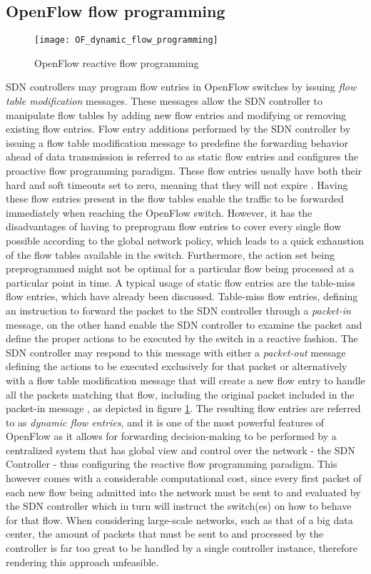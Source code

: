 \subsection{OpenFlow flow programming}
\label{subsection:openflow-flow-programming}
%
\begin{figure}
	\centering
	\texttt{[image: OF\_dynamic\_flow\_programming]}
	\caption{OpenFlow reactive flow programming}
	\label{fig:OF_dynamic_flow_programming}
\end{figure}
%
\gls{SDN} controllers may program flow entries in OpenFlow switches by issuing \emph{flow table modification} messages.
These messages allow the \gls{SDN} controller to manipulate flow tables by adding new flow entries and modifying or removing existing flow entries.
Flow entry additions performed by the \gls{SDN} controller by issuing a flow table modification message to predefine the forwarding behavior ahead of data transmission is referred to as static flow entries and configures the proactive flow programming paradigm.
These flow entries usually have both their hard and soft timeouts set to zero, meaning that they will not expire \cite{OF13}.
Having these flow entries present in the flow tables enable the traffic to be forwarded immediately when reaching the OpenFlow switch.
However, it has the disadvantages of having to preprogram flow entries to cover every single flow possible according to the global network policy, which leads to a quick exhaustion of the flow tables available in the switch.
Furthermore, the action set being preprogrammed might not be optimal for a particular flow being processed at a particular point in time.
A typical usage of static flow entries are the table-miss flow entries, which have already been discussed.
%
Table-miss flow entries, defining an instruction to forward the packet to the \gls{SDN} controller through a \emph{packet-in} message, on the other hand enable the \gls{SDN} controller to examine the packet and define the proper actions to be executed by the switch in a reactive fashion.
The \gls{SDN} controller may respond to this message with either a \emph{packet-out} message defining the actions to be executed exclusively for that packet or alternatively with a flow table modification message that will create a new flow entry to handle all the packets matching that flow, including the original packet included in the packet-in message \cite{OF13}, as depicted in figure \ref{fig:OF_dynamic_flow_programming}.
%
The resulting flow entries are referred to as \emph{dynamic flow entries}, and it is one of the most powerful features of OpenFlow as it allows for forwarding decision-making to be performed by a centralized system that has global view and control over the network - the SDN Controller - thus configuring the reactive flow programming paradigm.
This however comes with a considerable computational cost, since every first packet of each new flow being admitted into the network must be sent to and evaluated by the \gls{SDN} controller which in turn will instruct the switch(es) on how to behave for that flow.
When considering large-scale networks, such as that of a big data center, the amount of packets that must be sent to and processed by the controller is far too great to be handled by a single controller instance, therefore rendering this approach unfeasible.
%